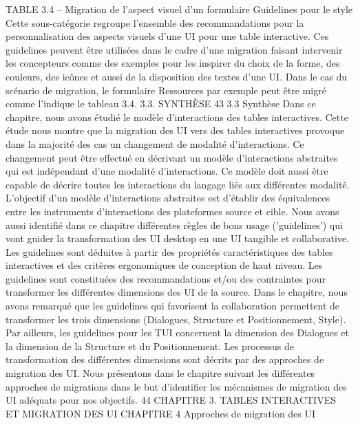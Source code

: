 \documentclass{article}
\begin{document}
 
TABLE 3.4 – Migration de l’aspect visuel d’un formulaire
Guidelines pour le style
Cette sous-cat\'{e}gorie regroupe l’ensemble des recommandations pour la
personnalisation des aspects visuels d’une UI pour une table interactive. Ces guidelines peuvent \^{e}tre
utilis\'{e}es dans le cadre d’une migration faisant intervenir les concepteurs comme des exemples pour les
inspirer du choix de la forme, des couleurs, des ic\^{o}nes et aussi de la disposition des textes d’une UI.
Dans le cas du sc\'{e}nario de migration, le formulaire Ressources par exemple peut \^{e}tre migr\'{e} comme
l’indique le tableau 3.4.
3.3. SYNTHÈSE
43
3.3
Synth\`{e}se
Dans ce chapitre, nous avons \'{e}tudi\'{e} le mod\`{e}le d’interactions des tables interactives. Cette \'{e}tude
nous montre que la migration des UI vers des tables interactives provoque dans la majorit\'{e} des cas
un changement de modalit\'{e} d’interactions. Ce changement peut \^{e}tre effectu\'{e} en d\'{e}crivant un mod\`{e}le
d’interactions abstraites qui est ind\'{e}pendant d’une modalit\'{e} d’interactions. Ce mod\`{e}le doit aussi \^{e}tre
capable de d\'{e}crire toutes les interactions du langage li\'{e}s aux diff\'{e}rentes modalit\'{e}. L’objectif d’un
mod\`{e}le d’interactions abstraites est d’\'{e}tablir des \'{e}quivalences entre les instruments d’interactions des
plateformes source et cible.
Nous avons aussi identiﬁ\'{e} dans ce chapitre diff\'{e}rentes r\`{e}gles de bons usage (’guidelines’) qui
vont guider la transformation des UI desktop en une UI tangible et collaborative. Les guidelines sont
d\'{e}duites \`{a} partir des propri\'{e}t\'{e}s caract\'{e}ristiques des tables interactives et des crit\`{e}res ergonomiques de
conception de haut niveau. Les guidelines sont constitu\'{e}es des recommandations et/ou des contraintes
pour transformer les diff\'{e}rentes dimensions des UI de la source. Dans le chapitre, nous avons remarqu\'{e} que les guidelines qui favorisent la collaboration permettent de transformer les trois dimensions
(Dialogues, Structure et Positionnement, Style). Par ailleurs, les guidelines pour les TUI concernent
la dimension des Dialogues et la dimension de la Structure et du Positionnement.
Les processus de transformation des diff\'{e}rentes dimensions sont d\'{e}crits par des approches de
migration des UI. Nous pr\'{e}sentons dans le chapitre suivant les diff\'{e}rentes approches de migrations
dans le but d’identiﬁer les m\'{e}canismes de migration des UI ad\'{e}quats pour nos objectifs.
44
CHAPITRE 3. TABLES INTERACTIVES ET MIGRATION DES UI
CHAPITRE 4
Approches de migration des UI
\end{document}
